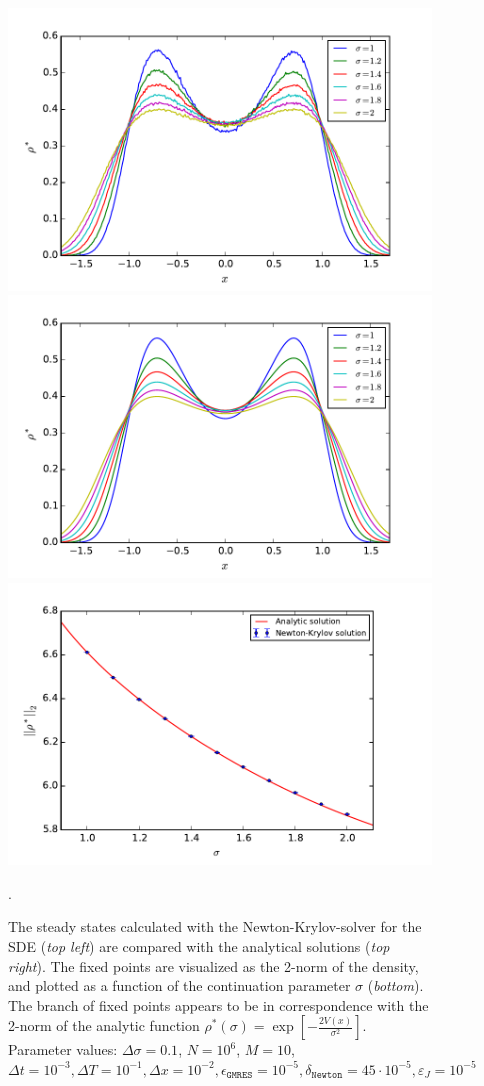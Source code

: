 \begin{figure}[h]
\centering
\includegraphics[width=0.49\linewidth]{../Problems/WeightedParticles/checkSystem/plots/bif/fixed_states_sde(sigma)_Ne6_mean_M10_LR}
\includegraphics[width=0.49\linewidth]{../Problems/WeightedParticles/checkSystem/plots/bif/fixed_states(sigma)_analytic}
\includegraphics[width=0.9\linewidth]{../Problems/WeightedParticles/checkSystem/plots/bif/bifurcation_sde_Ne6_anal(sigma)_LR}
\caption{The steady states calculated with the Newton-Krylov-solver for the SDE  (\textit{top left}) are compared with the analytical solutions (\textit{top right}). The fixed points are visualized as the 2-norm of the density, and plotted as a function of the continuation parameter $\sigma$ (\textit{bottom}). The branch of fixed points appears to be in correspondence with the 2-norm of the analytic function $\rho^*(\sigma) =  \exp{\left[-\frac{2 V(x)}{\sigma^2}\right]} $. %
Parameter values: $\Delta \sigma =0.1$, $N=10^6$, $M=10$, $\Delta t = 10^{-3}, \Delta T = 10^{-1}, \Delta x = 10^{-2}, \epsilon_{\texttt{GMRES}}=10^{-5},  \delta_{\texttt{Newton}} = 45 \cdot 10^{-5}, \varepsilon_J=10^{-5}$}.
\label{fig:fixed_states_sde(sigma)_Ne6_mean_M10_LR}
\end{figure}





%
%



